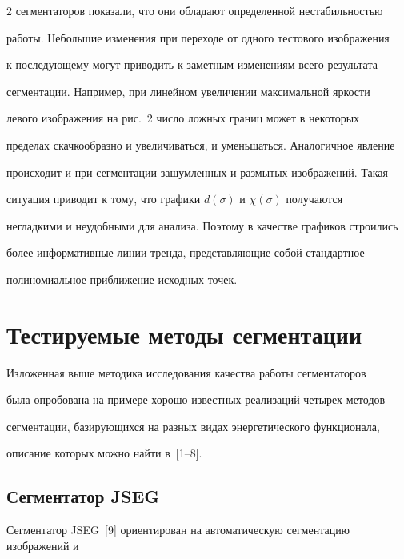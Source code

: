 \begin{multicols}{2}
сегментаторов показали, что они обладают определенной нестабильностью 


работы. Небольшие изменения при переходе от одного тестового изображения 


к последующему могут приводить к заметным изменениям всего результата 


сегментации. Например, при линейном увеличении максимальной яркости 


левого изображения на рис.~2 число ложных границ может в некоторых 


пределах скачкообразно и увеличиваться, и уменьшаться. Аналогичное явление 


происходит и при сегментации зашумленных и размытых изоб\-ра\-же\-ний. Такая 


ситуация приводит к тому, что графики $d(\sigma)$ и $\chi(\sigma)$ получаются 


негладкими и неудобными для анализа. Поэтому в качестве графиков строились 


более информативные линии тренда, пред\-став\-ля\-ющие собой стандартное 


полиномиальное приближение исходных точек.


  


  \section{Тестируемые методы сегментации}


  


  Изложенная выше методика исследования качества работы сегментаторов 


была опробована на примере хорошо известных реализаций четырех методов 


сегментации, базирующихся на разных видах энергетического функционала, 


описание которых можно найти в~[1--8].


  


  \subsection{Сегментатор JSEG} %


  


  Сегментатор JSEG~[9] ориентирован на автоматическую сегментацию изображений и 



\end{multicols}

